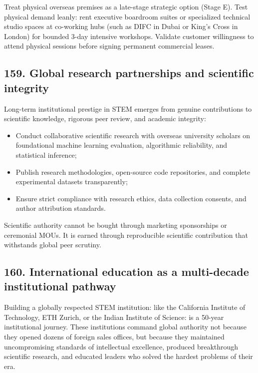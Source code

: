 Treat physical overseas premises as a late-stage strategic option (Stage E). Test physical demand leanly: rent executive boardroom suites or specialized technical studio spaces at co-working hubs (such as DIFC in Dubai or King's Cross in London) for bounded 3-day intensive workshops. Validate customer willingness to attend physical sessions before signing permanent commercial leases.

\subsection{159. Global research partnerships and scientific integrity}

Long-term institutional prestige in STEM emerges from genuine contributions to scientific knowledge, rigorous peer review, and academic integrity:
\begin{itemize}
    \item Conduct collaborative scientific research with overseas university scholars on foundational machine learning evaluation, algorithmic reliability, and statistical inference;
    \item Publish research methodologies, open-source code repositories, and complete experimental datasets transparently;
    \item Ensure strict compliance with research ethics, data collection consents, and author attribution standards.
\end{itemize}
Scientific authority cannot be bought through marketing sponsorships or ceremonial MOUs. It is earned through reproducible scientific contribution that withstands global peer scrutiny.

\subsection{160. International education as a multi-decade institutional pathway}

Building a globally respected STEM institution: like the California Institute of Technology, ETH Zurich, or the Indian Institute of Science: is a 50-year institutional journey. These institutions command global authority not because they opened dozens of foreign sales offices, but because they maintained uncompromising standards of intellectual excellence, produced breakthrough scientific research, and educated leaders who solved the hardest problems of their era.


